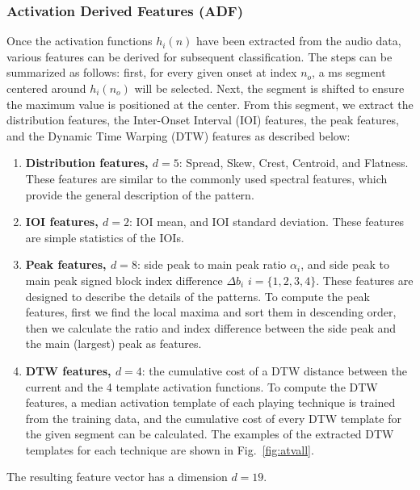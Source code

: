 \documentclass{article}
\begin{document}
\subsubsection{Activation Derived Features (ADF)}
\label{sssec:activ features}
Once the activation functions $h_{i}(n)$ have been extracted from the audio data, various features can be derived for subsequent classification. The steps can be summarized as follows: first, for every given onset at index $n_{o}$, a \unit[400]{ms} segment centered around $h_{i}(n_{o})$ will be selected. Next, the segment is shifted to ensure the maximum value is positioned at the center. From this segment, we extract the distribution features, the Inter-Onset Interval (IOI) features, the peak features, and the Dynamic Time Warping (DTW) features as described below: 

\begin{enumerate}
	\item \textbf{Distribution features, $d = 5$}: Spread, Skew, Crest, Centroid, and Flatness. These features are similar to the commonly used spectral features, which provide the general description of the pattern. 
	\item \textbf{IOI features, $d = 2$}: IOI mean, and IOI standard deviation. These features are simple statistics of the IOIs.
	\item \textbf{Peak features, $d = 8$}: side peak to main peak ratio $\alpha_{i}$, and side peak to main peak signed block index difference $\Delta b_{i}$ $i = \{1, 2, 3, 4\}$. These features are designed to describe the details of the patterns. To compute the peak features, first we find the local maxima and sort them in descending order, then we calculate the ratio and index difference between the side peak and the main (largest) peak as features.
	\item \textbf{DTW features, $d = 4$}: the cumulative cost of a DTW distance between the current and the 4 template activation functions. To compute the DTW features, a median activation template of each playing technique is trained from the training data, and the cumulative cost of every DTW template for the given segment can be calculated. The examples of the extracted DTW templates for each technique are shown in Fig.~\ref{fig:atvall}.\\
\end{enumerate}
The resulting feature vector has a dimension $d = 19$.
\end{document}
